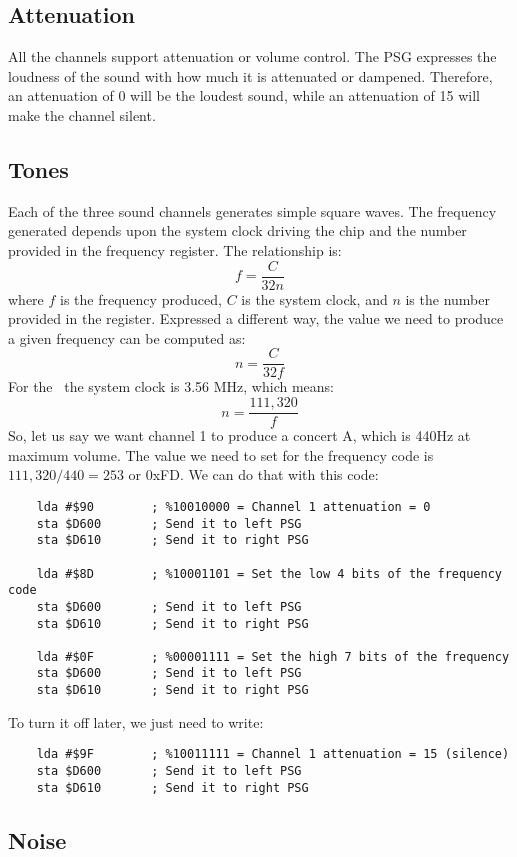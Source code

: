 \subsection{Attenuation}

All the channels support attenuation or volume control. The PSG expresses the loudness of the sound with how much it is attenuated or dampened. Therefore, an attenuation of 0 will be the loudest sound, while an attenuation of 15 will make the channel silent.

\subsection{Tones}

Each of the three sound channels generates simple square waves. The frequency generated depends upon the system clock driving the chip and the number provided in the frequency register. The relationship is:
\[
f = \frac{C}{32n}
\]
where $f$ is the frequency produced, $C$ is the system clock, and $n$ is the number provided in the register. Expressed a different way, the value we need to produce a given frequency can be computed as:
\[
n = \frac{C}{32f}
\]
For the \jr\ the system clock is 3.56 MHz, which means:
\[
n = \frac{111,320}{f}
\]
So, let us say we want channel 1 to produce a concert A, which is 440Hz at maximum volume. The value we need to set for the frequency code is $111,320 / 440 = 253$ or 0xFD. We can do that with this code:

\begin{verbatim}
    lda #$90        ; %10010000 = Channel 1 attenuation = 0
    sta $D600       ; Send it to left PSG
    sta $D610       ; Send it to right PSG

    lda #$8D        ; %10001101 = Set the low 4 bits of the frequency code
    sta $D600       ; Send it to left PSG
    sta $D610       ; Send it to right PSG

    lda #$0F        ; %00001111 = Set the high 7 bits of the frequency
    sta $D600       ; Send it to left PSG
    sta $D610       ; Send it to right PSG
\end{verbatim}
To turn it off later, we just need to write:

\begin{verbatim}
    lda #$9F        ; %10011111 = Channel 1 attenuation = 15 (silence)
    sta $D600       ; Send it to left PSG
    sta $D610       ; Send it to right PSG
\end{verbatim}

\subsection{Noise}

